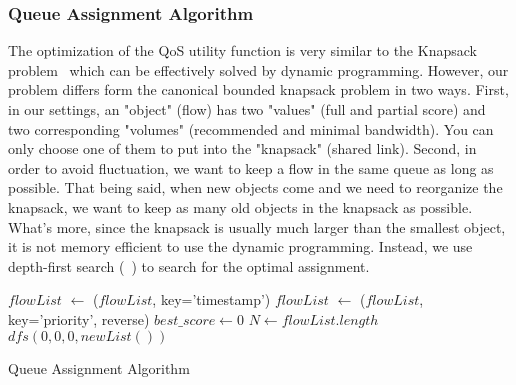 \subsubsection{Queue Assignment Algorithm}
\label{sect:queueAssignAlgo}

The optimization of the QoS utility function is very similar to the Knapsack problem~\cite{knapsack} which can be effectively solved by dynamic
programming. However, our problem differs form the canonical bounded knapsack problem in two ways. First, in our settings, an "object" (flow) has
two "values" (full and partial score) and two corresponding "volumes" (recommended and minimal bandwidth). You can only choose one of them to put
into the "knapsack" (shared link). Second, in order to avoid fluctuation, we want to keep a flow in the same queue as long as possible. That being
said, when new objects come and we need to reorganize the knapsack, we want to keep as many old objects in the knapsack as possible. What's more,
since the knapsack is usually much larger than the smallest object, it is not memory efficient to use the dynamic programming. Instead, we use
depth-first search (~) to search for the optimal assignment.

\begin{algorithm}[htp]
  \SetAlgoLined
  \scriptsize
  
  $flowList$ $\leftarrow$ \Sort($flowList$, key='timestamp')\;
  $flowList$ $\leftarrow$ \Sort($flowList$, key='priority', reverse)\;
  $best\_score \leftarrow 0$ \;
  $N \leftarrow flowList.length$ \;
  $dfs(0, 0, 0, newList())$ \;
  \setcounter{AlgoLine}{0}
  \caption{Queue Assignment Algorithm}
  \label{alg:queueAssignAlgo}
\end{algorithm} 


